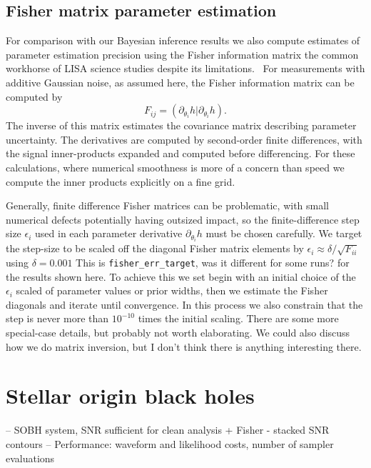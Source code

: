 \documentclass[aps,showpacs,twocolumn,prd,superscriptaddress,nofootinbib]{revtex4-1}
\newcommand{\be}{\begin{equation}}
\newcommand{\ee}{\end{equation}}
\newcommand{\jgb}[1]{{\color{DarkGreen} #1}}
\begin{document}

\subsection{Fisher matrix parameter estimation}
\label{sec:Fisher}

For comparison with our Bayesian inference results we also compute estimates of parameter estimation precision using the Fisher information matrix the common workhorse of LISA science studies despite its limitations.~\cite{Vallisneri08}  For measurements with additive Gaussian noise, as assumed here, the Fisher information matrix can be computed by
\be
F_{ij}=\left( \partial_{\theta_i} h| \partial_{\theta_i} h \right).
\ee
The inverse of this matrix estimates the covariance matrix describing parameter uncertainty. 
The derivatives are computed by second-order finite differences, with the signal inner-products expanded and computed before differencing. For these calculations, where numerical smoothness is more of a concern than speed we compute the inner products explicitly on a fine grid.

Generally, finite difference Fisher matrices can be problematic, with small numerical defects potentially having outsized impact, so the finite-difference step size $\epsilon_i$ used in each parameter derivative $\partial_{\theta_i}h$ must be chosen carefully. We target the step-size to be scaled off the diagonal Fisher matrix elements by ${\epsilon_i}\approx\delta/\sqrt{F_{ii}}$ using $\delta=0.001$ \jgb{This is \texttt{fisher\_err\_target}, was it different for some runs?}  for the results shown here.  To achieve this we set begin with an initial choice of the $\epsilon_i$ scaled of parameter values or prior widths, then we estimate the Fisher diagonals and iterate until convergence. In this process we also constrain that the step is never more than $10^{-10}$ times the initial scaling. \jgb{There are some more special-case details, but probably not worth elaborating.  We could also discuss how we do matrix inversion, but I don't think there is anything interesting there.}

\section{Stellar origin black holes}
\label{sec:SOBH}

-- SOBH system, SNR sufficient for clean analysis + Fisher - stacked SNR contours
-- Performance: waveform and likelihood costs, number of sampler evaluations
\end{document}
